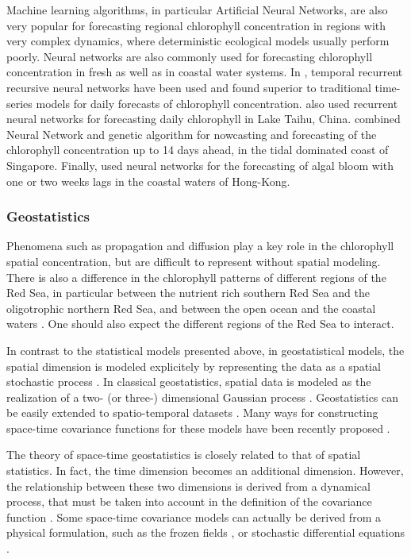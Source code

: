 Machine learning algorithms, in particular Artificial Neural Networks,
are also very popular for forecasting regional chlorophyll concentration in regions
with very complex dynamics, where deterministic ecological models usually
perform poorly. Neural networks are also commonly used for forecasting
chlorophyll concentration in fresh as well as in coastal water systems. In
\citet{Jeong2006}, temporal recurrent recursive neural networks have been used
and found superior to traditional time-series models for daily forecasts of
chlorophyll concentration.  \citet{Wang2013} also used recurrent neural
networks for forecasting daily chlorophyll in Lake Taihu, China.
\citet{Mulia2013} combined Neural Network and genetic algorithm for nowcasting
and forecasting of the chlorophyll concentration up to 14 days ahead, in the
tidal dominated coast of Singapore.  Finally, \citet{Lee2003} used neural
networks for the forecasting of algal bloom with one or two weeks lags in the
coastal waters of Hong-Kong.

\subsubsection{Geostatistics}

Phenomena such as propagation and diffusion play a key role in the chlorophyll
spatial concentration, but are difficult to represent without spatial modeling.
There is also a difference in the chlorophyll patterns of different regions of
the Red Sea, in particular between the nutrient rich southern Red Sea and the
oligotrophic northern Red Sea, and between the open ocean and the coastal
waters \citep{Raitsos2013}.  One should also expect the different regions of
the Red Sea to interact.

In contrast to the statistical models presented above, in geostatistical
models, the spatial dimension is modeled explicitely by representing the data
as a spatial stochastic process \citep{Gneiting2007}. In classical
geostatistics, spatial data is modeled as the realization of a two- (or three-)
dimensional Gaussian process \citep{Gneiting2007}.  Geostatistics can be easily
extended to spatio-temporal datasets \citep{Gneiting2007}. Many ways for
constructing space-time covariance functions for these models have been
recently proposed \citep{Gneiting2002, Cressie1999, Stein2005}.

The theory of space-time geostatistics is closely related to that of spatial
statistics. In fact, the time dimension becomes an additional dimension. However,
the relationship between these two dimensions is derived from a dynamical process,
that must be taken into account in the definition of the covariance function
\citep{Gneiting2010}. Some space-time covariance models can actually be derived
from a physical formulation, such as the frozen fields \citep{Gneiting2010}, or
stochastic differential equations \citep{Brown2000, North2011}.

